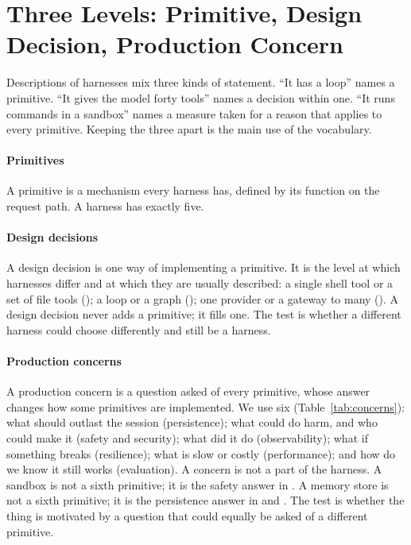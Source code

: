 \section{Three Levels: Primitive, Design Decision, Production Concern}
\label{sec:levels}
Descriptions of harnesses mix three kinds of statement. ``It has a loop'' names a primitive. ``It gives the model forty tools'' names a decision within one. ``It runs commands in a sandbox'' names a measure taken for a reason that applies to every primitive. Keeping the three apart is the main use of the vocabulary.

\paragraph{Primitives} A primitive is a mechanism every harness has, defined by its function on the request path. A harness has exactly five.

\paragraph{Design decisions} A design decision is one way of implementing a primitive. It is the level at which harnesses differ and at which they are usually described: a single shell tool or a set of file tools (); a loop or a graph (); one provider or a gateway to many (). A design decision never adds a primitive; it fills one. The test is whether a different harness could choose differently and still be a harness.

\paragraph{Production concerns} A production concern is a question asked of every primitive, whose answer changes how some primitives are implemented. We use six (Table~\ref{tab:concerns}): what should outlast the session (persistence); what could do harm, and who could make it (safety and security); what did it do (observability); what if something breaks (resilience); what is slow or costly (performance); and how do we know it still works (evaluation). A concern is not a part of the harness. A sandbox is not a sixth primitive; it is the safety answer in . A memory store is not a sixth primitive; it is the persistence answer in  and . The test is whether the thing is motivated by a question that could equally be asked of a different primitive.

